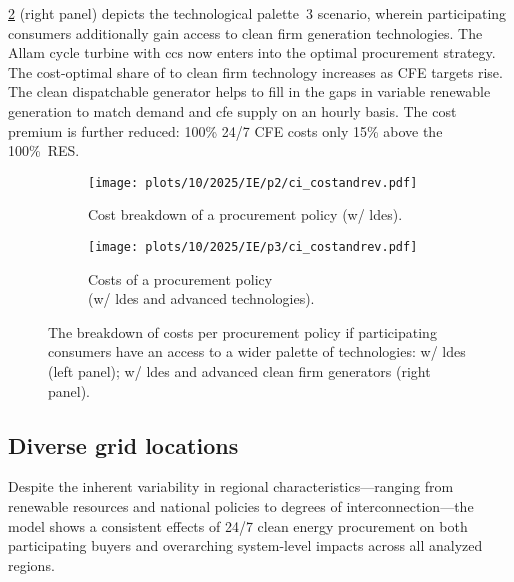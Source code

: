 \cref{fig:10-2025-IE-p3-ci_costandrev} (right panel) depicts the technological palette~3 scenario, wherein participating consumers additionally gain access to clean firm generation technologies.
The Allam cycle turbine with \gls{ccs} now enters into the optimal procurement strategy.
The cost-optimal share of to clean firm technology increases as CFE targets rise.
The clean dispatchable generator helps to fill in the gaps in variable renewable generation to match demand and \gls{cfe} supply on an hourly basis.
The cost premium is further reduced: 100\% 24/7 CFE costs only 15\% above the 100\%~RES.

\begin{figure*}
    \centering
    \begin{subfigure}{0.5\textwidth}
        \centering
        \caption{Cost breakdown of a procurement policy (w/ \gls{ldes}).}
        \texttt{[image: plots/10/2025/IE/p2/ci\_costandrev.pdf]}
        \label{fig:10-2025-IE-p2-ci_costandrev}
    \end{subfigure}%
    \begin{subfigure}{0.5\textwidth}
        \centering
        \caption{Costs of a procurement policy \\ 
        (w/ \gls{ldes} and advanced technologies).}
        \texttt{[image: plots/10/2025/IE/p3/ci\_costandrev.pdf]}
        \label{fig:10-2025-IE-p3-ci_costandrev}
    \end{subfigure}
    \caption{The breakdown of costs per procurement policy if participating consumers have an access to a wider palette of technologies: w/ \gls{ldes} (left panel); w/ \gls{ldes} and advanced clean firm generators (right panel).
    }
    \label{fig:10-2025-IE-p23-ci_procurement}
\end{figure*}


\subsection{Diverse grid locations}
\label{subsec:location}

\begin{res}
    Despite the inherent variability in regional charac\-teristics---ranging from renewable resources and national policies to degrees of interconnection---the model shows a consistent effects of 24/7 clean energy procurement on both participating buyers and overarching system-level impacts across all analyzed regions.
\end{res}


